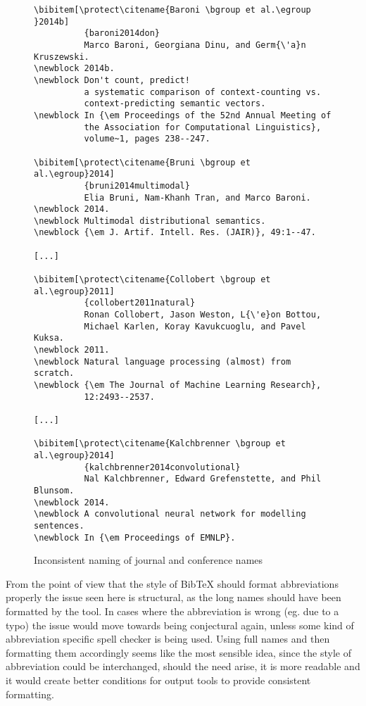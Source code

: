 \begin{figure}[ht]
  \centering
\begin{small}
\begin{verbatim}
\bibitem[\protect\citename{Baroni \bgroup et al.\egroup }2014b]
          {baroni2014don}
          Marco Baroni, Georgiana Dinu, and Germ{\'a}n Kruszewski.
\newblock 2014b.
\newblock Don't count, predict!
          a systematic comparison of context-counting vs.
          context-predicting semantic vectors.
\newblock In {\em Proceedings of the 52nd Annual Meeting of
          the Association for Computational Linguistics},
          volume~1, pages 238--247.

\bibitem[\protect\citename{Bruni \bgroup et al.\egroup}2014]
          {bruni2014multimodal}
          Elia Bruni, Nam-Khanh Tran, and Marco Baroni.
\newblock 2014.
\newblock Multimodal distributional semantics.
\newblock {\em J. Artif. Intell. Res. (JAIR)}, 49:1--47.

[...]

\bibitem[\protect\citename{Collobert \bgroup et al.\egroup}2011]
          {collobert2011natural}
          Ronan Collobert, Jason Weston, L{\'e}on Bottou,
          Michael Karlen, Koray Kavukcuoglu, and Pavel Kuksa.
\newblock 2011.
\newblock Natural language processing (almost) from scratch.
\newblock {\em The Journal of Machine Learning Research},
          12:2493--2537.

[...]

\bibitem[\protect\citename{Kalchbrenner \bgroup et al.\egroup}2014]
          {kalchbrenner2014convolutional}
          Nal Kalchbrenner, Edward Grefenstette, and Phil Blunsom.
\newblock 2014.
\newblock A convolutional neural network for modelling sentences.
\newblock In {\em Proceedings of EMNLP}.
\end{verbatim}
\end{small}
  \caption{Inconsistent naming of journal and conference names}
\label{fig:inconsistent_naming}
\end{figure}

From the point of view that the style of Bib{\TeX} should format
abbreviations properly the issue seen here is structural, as the long
names should have been formatted by the tool.  In cases where the
abbreviation is wrong (eg. due to a typo) the issue would move towards
being conjectural again, unless some kind of abbreviation specific
spell checker is being used.  Using full names and then formatting
them accordingly seems like the most sensible idea, since the style of
abbreviation could be interchanged, should the need arise, it is more
readable and it would create better conditions for output tools to
provide consistent formatting.

